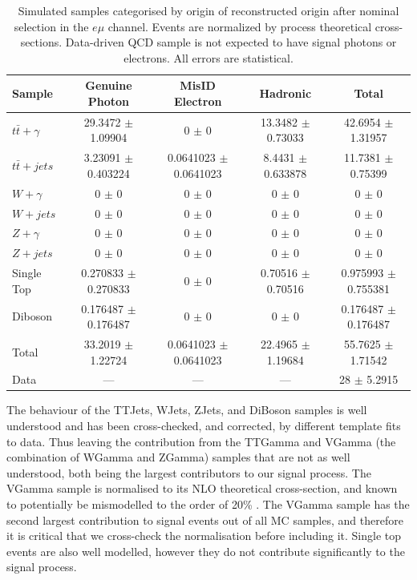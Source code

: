 \begin{table}
\begin{center}
\resizebox{\columnwidth}{!} {
\begin{tabular}{l|ccc|c}
\hline
	\textbf{Sample} & \textbf{Genuine Photon} & \textbf{MisID Electron} & \textbf{Hadronic} & \textbf{Total} \\
\hline
$t\bar{t}+\gamma$  & 29.3472 $\pm$ 1.09904 & 0 $\pm$ 0 & 13.3482 $\pm$ 0.73033 & 42.6954 $\pm$ 1.31957 \\
$t\bar{t}+jets$  & 3.23091 $\pm$ 0.403224 & 0.0641023 $\pm$ 0.0641023 & 8.4431 $\pm$ 0.633878 & 11.7381 $\pm$ 0.75399 \\
$W+\gamma$  & 0 $\pm$ 0 & 0 $\pm$ 0 & 0 $\pm$ 0 & 0 $\pm$ 0 \\
$W+jets$  & 0 $\pm$ 0 & 0 $\pm$ 0 & 0 $\pm$ 0 & 0 $\pm$ 0 \\
$Z+\gamma$  & 0 $\pm$ 0 & 0 $\pm$ 0 & 0 $\pm$ 0 & 0 $\pm$ 0 \\
$Z+jets$  & 0 $\pm$ 0 & 0 $\pm$ 0 & 0 $\pm$ 0 & 0 $\pm$ 0 \\
Single Top  & 0.270833 $\pm$ 0.270833 & 0 $\pm$ 0 & 0.70516 $\pm$ 0.70516 & 0.975993 $\pm$ 0.755381 \\
Diboson  & 0.176487 $\pm$ 0.176487 & 0 $\pm$ 0 & 0 $\pm$ 0 & 0.176487 $\pm$ 0.176487 \\
\hline
Total  & 33.2019 $\pm$ 1.22724 & 0.0641023 $\pm$ 0.0641023 & 22.4965 $\pm$ 1.19684 & 55.7625 $\pm$ 1.71542 \\
Data  & --- & --- & --- & 28 $\pm$ 5.2915 \\
\hline	
\end{tabular}
}
\end{center}
\caption{Simulated samples categorised by origin of reconstructed origin after nominal selection in the $e\mu$ channel. Events are normalized by process theoretical cross-sections. Data-driven QCD sample is not expected to have signal photons or electrons. All errors are statistical.}
\label{tab-SigPhotonsEMu}
\end{table}	

The behaviour of the TTJets, WJets, ZJets, and DiBoson samples is well understood and has been cross-checked, and corrected, by different template fits to data. Thus leaving the contribution from the TTGamma and VGamma (the combination of WGamma and ZGamma) samples that are not as well understood, both being the largest contributors to our signal process. The VGamma sample is normalised to its NLO theoretical cross-section, and known to potentially be mismodelled to the order of 20\% \cite{PhysRevD.89.092005}. The VGamma sample has the second largest contribution to signal events out of all MC samples, and therefore it is critical that we cross-check the normalisation before including it. Single top events are also well modelled, however they do not contribute significantly to the signal process.

